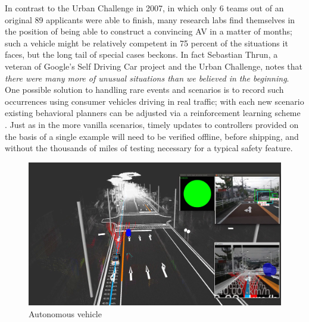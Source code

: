  In contrast to the Urban Challenge in 2007, in which only 6 teams out of an original 89 applicants were able to finish, many research labs find themselves in the position of being able to construct a convincing AV in a matter of months; such a vehicle might be relatively competent in 75 percent of the situations it faces, but the long tail of special cases beckons. In fact Sebastian Thrun, a veteran of Google's Self Driving Car project and the Urban Challenge, notes that \emph{there were many more of unusual situations than we believed in the beginning}. One possible solution to handling rare events and scenarios is to record such occurrences using consumer vehicles driving in real traffic; with each new scenario existing behavioral planners can be adjusted via a reinforcement learning scheme \cite{wei2013autonomous, Silver_2010, Waldrop2015}. Just as in the more vanilla scenarios, timely updates to controllers provided on the basis of a single example will need to be verified offline, before shipping, and without the thousands of miles of testing necessary for a typical safety feature. 
 
 \begin{figure}
 	\includegraphics[width=\columnwidth]{figures/apex_planning.png}
 	\caption{Autonomous vehicle}
 \end{figure}
 
 
 
 
